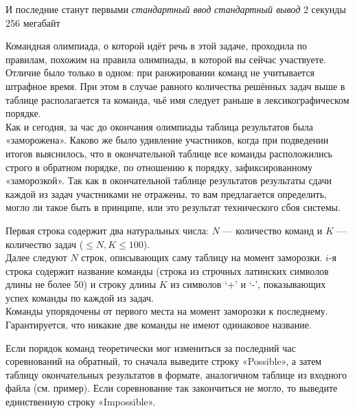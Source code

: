 \begin{problem}%
{И последние станут первыми}%
{\textsl{стандартный ввод}}%
{\textsl{стандартный вывод}}%
{2 секунды}%
{256 мегабайт}{}

Командная олимпиада, о которой идёт речь в этой задаче, проходила по правилам, похожим на правила олимпиады, в которой вы сейчас участвуете. Отличие было только в одном: при ранжировании команд не учитывается штрафное время. При этом в случае равного количества решённых задач выше в таблице располагается та команда, чьё имя следует раньше в лексикографическом порядке.\\

Как и сегодня, за час до окончания олимпиады таблица результатов была «заморожена». Каково же было удивление участников, когда при подведении итогов выяснилось, что в окончательной таблице все команды расположились строго в обратном порядке, по отношению к порядку, зафиксированному «заморозкой». Так как в окончательной таблице результатов результаты сдачи каждой из задач участниками не отражены, то вам предлагается определить, могло ли такое быть в принципе, или это результат технического сбоя системы.

\InputFile

Первая строка содержит два натуральных числа: $N$ — количество команд и $K$ — количество задач ($ \le N, K \le 100$).\\

Далее следуют $N$ строк, описывающих саму таблицу на момент заморозки. $i$-я строка содержит название команды (строка из строчных латинских символов длины не более 50) и строку длины $K$ из символов ‘+’ и ‘-’, показывающих успех команды по каждой из задач.\\

Команды упорядочены от первого места на момент заморозки к последнему.\\

Гарантируется, что никакие две команды не имеют одинаковое название.

\OutputFile

Если порядок команд теоретически мог измениться за последний час соревнований на обратный, то сначала выведите строку «Possible», а затем таблицу окончательных результатов в формате, аналогичном таблице из входного файла (см. пример). Если соревнование так закончиться не могло, то выведите единственную строку «Impossible».

\Examples

\begin{example}
%
%
\end{example}
\end{problem}